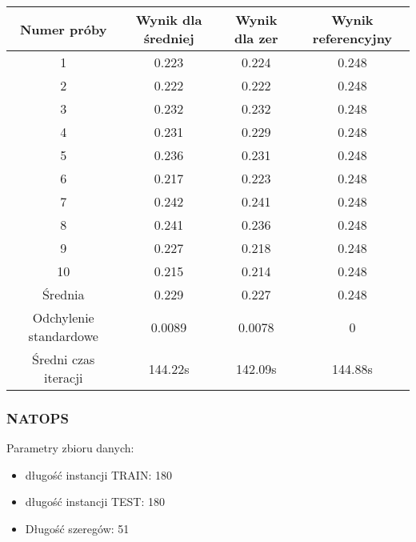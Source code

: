 \documentclass[12pt]{article}
\begin{document}
\begin{center}
\begin{tabular}{|c c c c|} 
 \hline
 Numer próby & Wynik dla średniej & Wynik dla zer & Wynik referencyjny \\ [0.5ex] 
 \hline\hline
 1 & 0.223 & 0.224 & 0.248 \\ 
 \hline
 2 & 0.222 & 0.222 & 0.248 \\
 \hline
 3 & 0.232 & 0.232 & 0.248 \\
 \hline
 4 & 0.231 & 0.229 & 0.248 \\
 \hline
  5 & 0.236 & 0.231 & 0.248 \\
 \hline
  6 & 0.217 & 0.223 & 0.248 \\
 \hline
  7 & 0.242 & 0.241 & 0.248 \\
 \hline
  8 & 0.241 & 0.236 & 0.248 \\
 \hline
  9 & 0.227 & 0.218 & 0.248 \\
 \hline
  10 & 0.215 & 0.214 & 0.248 \\
 \hline
  Średnia & 0.229 & 0.227 & 0.248 \\
 \hline
  Odchylenie standardowe & 0.0089 & 0.0078 & 0 \\
 \hline
  Średni czas iteracji & 144.22s & 142.09s & 144.88s \\
 \hline
\end{tabular}
\end{center}

\subsubsection*{NATOPS}
Parametry zbioru danych:
\begin{itemize}
  \item długość instancji TRAIN: 180
  \item długość instancji TEST: 180
  \item Długość szeregów: 51
\end{itemize}
\end{document}
